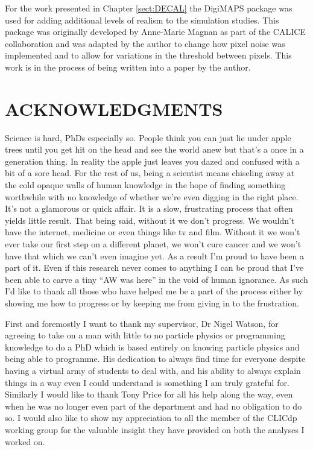 For the work presented in Chapter \ref{sect:DECAL} the DigiMAPS package was used for adding additional levels of realism to the simulation studies. This package was originally developed by Anne-Marie Magnan as part of the \ac{CALICE} collaboration and was adapted by the author to change how pixel noise was implemented and to allow for variations in the threshold between pixels. This work is in the process of being written into a paper by the author.

%
\clearpage
\chapter*{ACKNOWLEDGMENTS}
%
Science is hard, PhDs especially so. People think you can just lie under apple trees until you get hit on the head and see the world anew but that's a once in a generation thing. In reality the apple just leaves you dazed and confused with a bit of a sore head. For the rest of us, being a scientist means chiseling away at the cold opaque walls of human knowledge in the hope of finding something worthwhile with no knowledge of whether we're even digging in the right place. It's not a glamorous or quick affair. It is a slow, frustrating process that often yields little result. That being said, without it we don't progress. We wouldn't have the internet, medicine or even things like tv and film. Without it we won't ever take our first step on a different planet, we won't cure cancer and we won't have that which we can't even imagine yet. As a result I'm proud to have been a part of it. Even if this research never comes to anything I can be proud that I've been able to carve a tiny ``AW was here'' in the void of human ignorance. As such I'd like to thank all those who have helped me be a part of the process either by showing me how to progress or by keeping me from giving in to the frustration.  

First and foremostly I want to thank my supervisor, Dr Nigel Watson, for agreeing to take on a man with little to no particle physics or programming knowledge to do a PhD which is based entirely on knowing particle physics and being able to programme. His dedication to always find time for everyone despite having a virtual army of students to deal with, and his ability to always explain things in a way even I could understand is something I am truly grateful for. Similarly I would like to thank Tony Price for all his help along the way, even when he was no longer even part of the department and had no obligation to do so. I would also like to show my appreciation to all the member of the CLICdp working group for the valuable insight they have provided on both the analyses I worked on.


